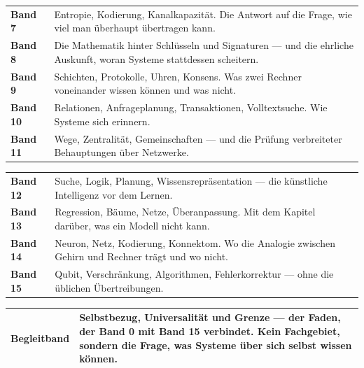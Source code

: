 \begin{merksatz}
\begin{center}
{\small
\renewcommand{\arraystretch}{1.42}
\begin{tabular}{@{}P{2.2cm}P{6.6cm}@{}}
\toprule
\textbf{Band 7} & Entropie, Kodierung, Kanalkapazität. Die Antwort auf die Frage, wie viel man überhaupt übertragen kann.\\
\textbf{Band 8} & Die Mathematik hinter Schlüsseln und Signaturen --- und die ehrliche Auskunft, woran Systeme stattdessen scheitern.\\
\textbf{Band 9} & Schichten, Protokolle, Uhren, Konsens. Was zwei Rechner voneinander wissen können und was nicht.\\
\textbf{Band 10} & Relationen, Anfrageplanung, Transaktionen, Volltextsuche. Wie Systeme sich erinnern.\\
\textbf{Band 11} & Wege, Zentralität, Gemeinschaften --- und die Prüfung verbreiteter Behauptungen über Netzwerke.\\
\bottomrule
\end{tabular}}
\end{center}
\end{merksatz}

\begin{merksatz}
\begin{center}
{\small
\renewcommand{\arraystretch}{1.42}
\begin{tabular}{@{}P{2.2cm}P{6.6cm}@{}}
\toprule
\textbf{Band 12} & Suche, Logik, Planung, Wissensrepräsentation --- die künstliche Intelligenz vor dem Lernen.\\
\textbf{Band 13} & Regression, Bäume, Netze, Überanpassung. Mit dem Kapitel darüber, was ein Modell nicht kann.\\
\textbf{Band 14} & Neuron, Netz, Kodierung, Konnektom. Wo die Analogie zwischen Gehirn und Rechner trägt und wo nicht.\\
\textbf{Band 15} & Qubit, Verschränkung, Algorithmen, Fehlerkorrektur --- ohne die üblichen Übertreibungen.\\
\bottomrule
\end{tabular}}
\end{center}
\end{merksatz}

\begin{merksatz}
\begin{center}
{\small
\renewcommand{\arraystretch}{1.42}
\begin{tabular}{@{}P{2.4cm}P{6.4cm}@{}}
\toprule
\textbf{Begleitband} & Selbstbezug, Universalität und Grenze --- der Faden, der Band 0 mit Band 15 verbindet. Kein Fachgebiet, sondern die Frage, was Systeme über sich selbst wissen können.\\
\bottomrule
\end{tabular}}
\end{center}
\end{merksatz}

